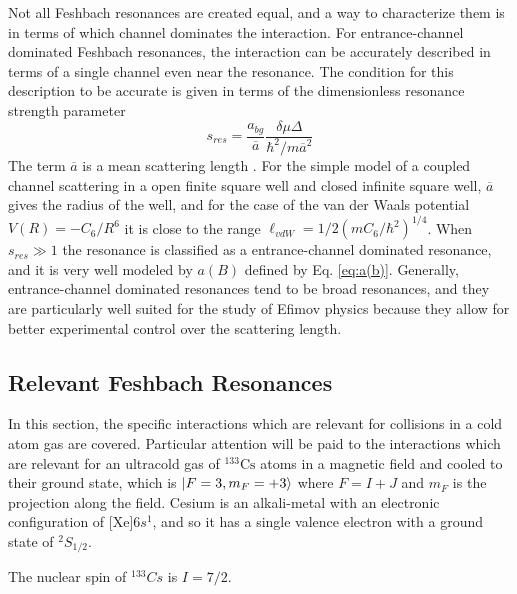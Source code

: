 \documentclass[prl,onecolumn,amsmath,amssymb,titlepage,nofootinbib,preprint]{revtex4-1}
\begin{document}
	Not all Feshbach resonances are created equal, and a way to characterize them is in terms of which channel dominates the interaction.  For entrance-channel dominated Feshbach resonances, the interaction can be accurately described in terms of a single channel even near the resonance.   The condition for this description to be accurate is given in terms of the dimensionless resonance strength parameter \cite{Chin2010}
	\begin{equation}\label{eq:s_res_defined}
		s_{res}=\frac{a_{bg}}{\overline{a}}\frac{\delta\mu\Delta}{\hbar^{2}/m\overline{a}^{2}}
	\end{equation}
	The term $\overline{a}$ is a mean scattering length \cite{Gribakin1993}.  For the simple model of a coupled channel scattering in a open finite square well and closed infinite square well, $\overline{a}$ gives the radius of the well, and for the case of the van der Waals potential $V(R)=-C_{6}/R^{6}$ it is close to the range $\ell_{vdW}=1/2(m C_{6}/\hbar^{2})^{1/4}$.  When $s_{res}\gg1$ the resonance is classified as a entrance-channel dominated resonance, and it is very well modeled by $a(B)$ defined by Eq. \ref{eq:a(b)}. \cite{Chin2010}  Generally, entrance-channel dominated resonances tend to be broad resonances, and they are particularly well suited for the study of Efimov physics because they allow for better experimental control over the scattering length.

	\subsection{Relevant Feshbach Resonances}
In this section, the specific interactions which are relevant for collisions in a cold atom gas are covered. Particular attention will be paid to the interactions which are relevant for an ultracold gas of $^{133}\text{Cs}$ atoms in a magnetic field and cooled to their ground state, which is $\ket{F=3,m_{F}=+3}$ where $F=I+J$ and $m_{F}$ is the projection along the field.  Cesium is an alkali-metal with an electronic configuration of [Xe]$6s^{1}$, and so it has a single valence electron with a ground state of $^{2}S_{1/2}$.  The nuclear spin of  $^{133}Cs$ is $I=7/2$.
\end{document}

